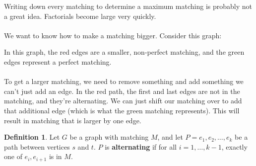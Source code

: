 \documentclass[]{article}
\theoremstyle{definition}
\newtheorem*{defn}{Definition}
\begin{document}
				Writing down every matching to determine a maximum matching is probably not a great idea. Factorials become large very quickly.
				\\ \\
				We want to know how to make a matching bigger. Consider this graph:
				\begin{center}
				\end{center}

				In this graph, the red edges are a smaller, non-perfect matching, and the green edges represent a perfect matching.
				\\ \\
				To get a larger matching, we need to remove something and add something \textendash{} we can't just add an edge. In the red path, the first and last edges are not in the matching, and they're alternating. We can just shift our matching over to add that additional edge (which is what the green matching represents). This will result in matching that is larger by one edge.

				\begin{defn}
					Let $G$ be a graph with matching $M$, and let $P = e_1, e_2, \ldots, e_k$ be a path between vertices $s$ and $t$. $P$ is \textbf{alternating} if for all $i = 1, \ldots, k - 1$, exactly one of $e_i, e_{i + 1}$ is in $M$.
				\end{defn}
\end{document}
